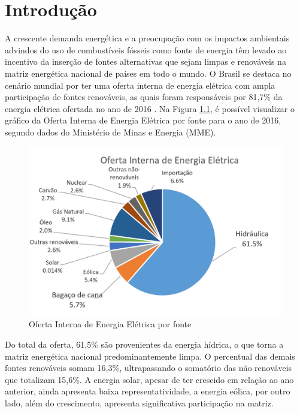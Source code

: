 \chapter[Introdução]{Introdução}

A crescente demanda energética e a preocupação com os impactos ambientais advindos do uso de combustíveis fósseis como fonte de energia têm levado ao incentivo da inserção de fontes alternativas que sejam limpas e renováveis na matriz energética nacional de países em todo o mundo. O Brasil se destaca no cenário mundial por ter uma oferta interna de energia elétrica com ampla participação de fontes renováveis, as quais foram responsáveis por 81,7\% da energia elétrica ofertada no ano de 2016 \cite{mme2017}. Na Figura \ref{figura_matriz}, é possível visualizar o gráfico da Oferta Interna de Energia Elétrica por fonte para o ano de 2016, segundo dados do Ministério de Minas e Energia (MME).

\begin{figure}[!htb]
	\centering
	\includegraphics{Figuras/OIEE}
	\caption{Oferta Interna de Energia Elétrica por fonte \cite{mme2017}}
	\label{figura_matriz}
\end{figure}

Do total da oferta, 61,5\% são provenientes da energia hídrica, o que torna a matriz energética nacional predominantemente limpa. O percentual das demais fontes renováveis somam 16,3\%, ultrapassando o somatório das não renováveis que totalizam 15,6\%. A energia solar, apesar de ter crescido em relação ao ano anterior, ainda apresenta baixa representatividade, a energia eólica, por outro lado, além do crescimento, apresenta significativa participação na matriz.

